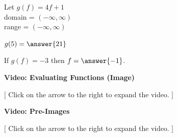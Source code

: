 \documentclass{ximera}
\begin{document}
\begin{question}

Let $g(f) = 4f+1$ \\
domain = $(-\infty, \infty)$ \\
range = $(-\infty, \infty)$


$g(5) = \answer{21}$

If $g(f) = -3$ then $f = \answer{-1}$.
\end{question}





\begin{explanation} \textbf{\textcolor{red!75!green}{Video: Evaluating Functions (Image)}}

[ Click on the arrow to the right to expand the video. ]
\begin{expandable} 

\begin{center}
\end{center}

\end{expandable}
\end{explanation}






\begin{explanation} \textbf{\textcolor{red!75!green}{Video: Pre-Images}}

[ Click on the arrow to the right to expand the video. ]
\begin{expandable} 

\begin{center}
\end{center}

\end{expandable}
\end{explanation}
\end{document}
